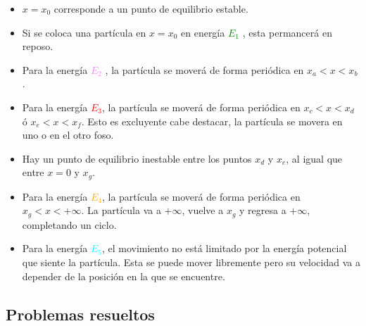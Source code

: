 \documentclass[/home/hernan/Documentos/Apuntes_mecanica_teorica/main.tex]{subfiles}
\begin{document}
	\begin{itemize}
		\item $x = x_{0}$ corresponde a un punto de equilibrio estable.
		\item Si se coloca una partícula en $x = x_{0}$ en energía \textcolor{green}{$E_{1}$} , esta permancerá en reposo.
		\item Para la energía \textcolor{violet}{$E_{2}$} , la partícula se moverá de forma periódica en $x_{a} < x < x_{b}$.
		\item Para la energía \textcolor{red}{$E_{3}$}, la partícula se moverá de forma periódica en $x_{c} < x < x_{d}$ ó $x_{e} < x < x_{f}$. Esto es excluyente cabe destacar, la partícula se movera en uno o en el otro foso.
		\item Hay un punto de equilibrio inestable entre los puntos $x_{d}$ y $x_{e}$, al igual que entre $x = 0$ y $x_{g}$.
		\item Para la energía \textcolor{orange}{$E_{4}$}, la partícula se moverá de forma periódica en $x_{g} < x < +\infty $. La partícula va a $+\infty$, vuelve a $x_{g}$ y regresa a $+\infty$, completando un ciclo.
		\item Para la energía \textcolor{cyan}{$E_{5}$}, el movimiento no está limitado por la energía potencial que siente la partícula. Esta se puede mover libremente pero su velocidad va a depender de la posición en la que se encuentre.
	\end{itemize}


	\subsection{Problemas resueltos}

	
	
\end{document}
